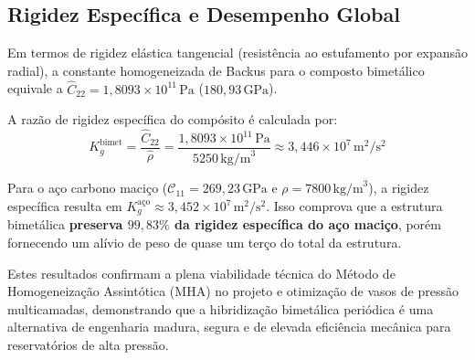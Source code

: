\subsection{Rigidez Específica e Desempenho Global}

Em termos de rigidez elástica tangencial (resistência ao estufamento por expansão radial), a constante homogeneizada de Backus para o composto bimetálico equivale a $\hat{C}_{22} = 1,8093 \times 10^{11} \, \text{Pa}$ ($180,93 \, \text{GPa}$).

A razão de rigidez específica do compósito é calculada por:
\begin{equation}
  K_g^{\text{bimet}} = \frac{\hat{C}_{22}}{\hat{\rho}} = \frac{1,8093 \times 10^{11} \, \text{Pa}}{5250 \, \text{kg/m}^3} \approx 3,446 \times 10^7 \, \text{m}^2/\text{s}^2
  \label{eq:rigidez_especifica_bimet}
\end{equation}

Para o aço carbono maciço ($\mathcal{C}_{11} = 269,23 \, \text{GPa}$ e $\rho = 7800 \, \text{kg/m}^3$), a rigidez específica resulta em $K_g^{\text{aço}} \approx 3,452 \times 10^7 \, \text{m}^2/\text{s}^2$. Isso comprova que a estrutura bimetálica \textbf{preserva $99,83\%$ da rigidez específica do aço maciço}, porém fornecendo um alívio de peso de quase um terço do total da estrutura.

Estes resultados confirmam a plena viabilidade técnica do Método de Homogeneização Assintótica (MHA) no projeto e otimização de vasos de pressão multicamadas, demonstrando que a hibridização bimetálica periódica é uma alternativa de engenharia madura, segura e de elevada eficiência mecânica para reservatórios de alta pressão.